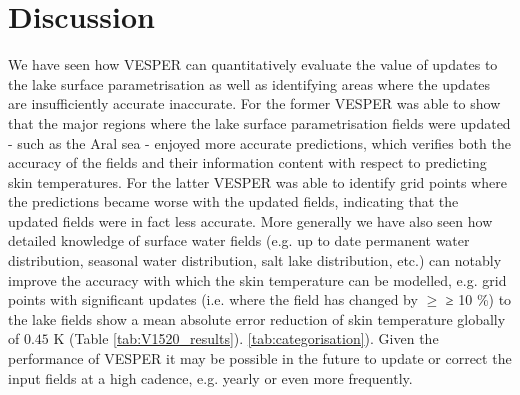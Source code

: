 \documentclass[hess, twostagejnl]{copernicus}
\providecommand{\DIFadd}[1]{{\protect\color{blue} \sf #1}} %
\providecommand{\DIFdel}[1]{{\protect\color{red} \scriptsize #1}} %
\providecommand{\DIFaddbegin}{} %
\providecommand{\DIFaddend}{} %
\providecommand{\DIFdelbegin}{} %
\providecommand{\DIFdelend}{} %
\begin{document}
\section{Discussion} \DIFdelbegin %
\DIFdelend \DIFaddbegin \label{sec:discussion}
\DIFaddend We have seen how VESPER can quantitatively evaluate the value of updates to the lake surface parametrisation as well as identifying areas where the updates are \DIFdelbegin \DIFdel{insufficiently accurate}\DIFdelend \DIFaddbegin \DIFadd{inaccurate}\DIFaddend . For the former VESPER was able to show that the major regions where the lake surface parametrisation fields were updated - such as the Aral sea - enjoyed more accurate predictions, which verifies both the accuracy of the fields and their information content with respect to predicting skin temperatures. For the latter VESPER was able to identify grid points where the predictions became worse with the updated fields, indicating that the updated fields were in fact less accurate. More generally we have also seen how detailed knowledge of surface water fields (e.g. up to date permanent water distribution, seasonal water distribution, salt lake distribution, etc.) can notably improve the accuracy with which the skin temperature can be modelled, e.g. grid points with significant updates (i.e. where the field has changed by \DIFdelbegin \DIFdel{$\geq$ }\DIFdelend \DIFaddbegin \DIFadd{≥ }\DIFaddend 10 \%) to the lake fields show a mean absolute error reduction of skin temperature globally of \DIFdelbegin \DIFdel{$0.45$}\DIFdelend \DIFaddbegin \DIFadd{0.37}\DIFaddend K (Table \DIFdelbegin \DIFdel{\ref{tab:V1520_results}). }\DIFdelend \DIFaddbegin \DIFadd{\ref{tab:categorisation}). Given the performance of VESPER it may be possible in the future to update or correct the input fields at a high cadence, e.g. yearly or even more frequently.   }\newline 

\DIFaddend 
\end{document}

